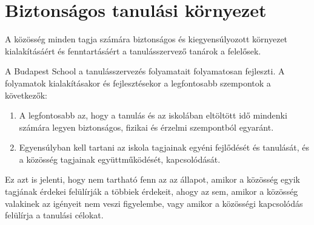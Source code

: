 \hypertarget{biztonsagos-tanulasi-kornyezet}{%
\section{Biztonságos tanulási
környezet}\label{biztonsagos-tanulasi-kornyezet}}

A közösség minden tagja számára biztonságos és kiegyensúlyozott
környezet kialakításáért és fenntartásáért a tanulásszervező tanárok a
felelősek.

A Budapest School a tanulásszervezés folyamatait folyamatosan fejleszti.
A folyamatok kialakításakor és fejlesztésekor a legfontosabb szempontok
a következők:

\begin{enumerate}
\def\labelenumi{\arabic{enumi}.}
\tightlist
\item
  A legfontosabb az, hogy a tanulás és az iskolában eltöltött idő mindenki
  számára legyen biztonságos, fizikai és érzelmi szempontból egyaránt.
\item
  Egyensúlyban kell tartani az iskola tagjainak egyéni fejlődését és
  tanulását, és a közösség tagjainak együttműködését, kapcsolódását.
\end{enumerate}

Ez azt is jelenti, hogy nem tartható fenn az az állapot, amikor a
közösség egyik tagjának érdekei felülírják a többiek érdekeit, ahogy az
sem, amikor a közösség valakinek az igényeit nem veszi figyelembe, vagy
amikor a közösségi kapcsolódás felülírja a tanulási célokat.
